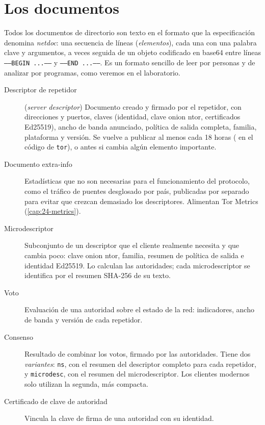 \section{Los documentos}\label{sec:dir-documenti}

Todos los documentos de directorio son texto en el formato que la especificación denomina \emph{netdoc}: una secuencia de líneas (\emph{elementos}), cada una con una palabra clave y argumentos, a veces seguida de un objeto codificado en base64 entre líneas \texttt{-----BEGIN ...-----} y \texttt{-----END ...-----}. Es un formato sencillo de leer por personas y de analizar por programas, como veremos en el laboratorio.

\begin{description}
  \item[Descriptor de repetidor] (\emph{server descriptor}) Documento creado y firmado por el repetidor, con direcciones y puertos, claves (identidad, clave onion ntor, certificados Ed25519), ancho de banda anunciado, política de salida completa, familia, plataforma y versión. Se vuelve a publicar al menos cada 18 horas ( en el código de \texttt{tor}), o antes si cambia algún elemento importante.
  \item[Documento extra-info] Estadísticas que no son necesarias para el funcionamiento del protocolo, como el tráfico de puentes desglosado por país, publicadas por separado para evitar que crezcan demasiado los descriptores. Alimentan Tor Metrics (\cref{cap:24-metrics}).
  \item[Microdescriptor] Subconjunto de un descriptor que el cliente realmente necesita y que cambia poco: clave onion ntor, familia, resumen de política de salida e identidad Ed25519. Lo calculan las autoridades; cada microdescriptor se identifica por el resumen SHA-256 de su texto.
  \item[Voto] Evaluación de una autoridad sobre el estado de la red: indicadores, ancho de banda y versión de cada repetidor.
  \item[Consenso] Resultado de combinar los votos, firmado por las autoridades. Tiene dos \emph{variantes}: \texttt{ns}, con el resumen del descriptor completo para cada repetidor, y \texttt{microdesc}, con el resumen del microdescriptor. Los clientes modernos solo utilizan la segunda, más compacta.
  \item[Certificado de clave de autoridad] Vincula la clave de firma de una autoridad con su identidad.
\end{description}

